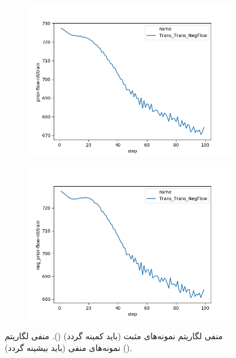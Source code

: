 \begin{figure}[h]
\centering
\begin{subfigure}[t]{0.3\textheight}
    \centering
    \includegraphics[width=1.\textwidth]{images/figs/2019_12_31__11_06_03__prior-flow-nll.png}
    \caption{}
    \label{fig:chap4:negprior_prior_nll}
\end{subfigure}
\begin{subfigure}[t]{0.3\textheight}
    \centering
    \includegraphics[width=1.\textwidth]{images/figs/2019_12_31__11_06_03__neg_prior-flow-nll.png}
    \caption{}
    \label{fig:chap4:negprior_negprior_nll}
\end{subfigure}
\caption{
                    منفی لگاریتم \likelihood{} نمونه‌های مثبت (باید کمینه گردد)
                    ().
                    منفی لگاریتم \likelihood{} نمونه‌های منفی (باید بیشینه گردد)
                    ().
}
    \label{fig:chap4:negprior}
\end{figure}

